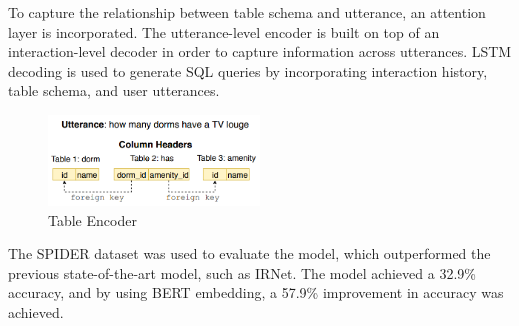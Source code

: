 To capture the relationship between table schema and utterance, an attention layer is incorporated.
The utterance-level encoder is built on top of an interaction-level decoder in order to capture information across utterances.
LSTM decoding is used to generate SQL queries by incorporating interaction history, table schema, and user utterances.

\begin{figure}[htb]
    \centering
    \includegraphics[width=0.5\textwidth]{pics/EditSQL/example.png}
    \caption{Table Encoder \cite{DBLP:journals/corr/abs-1909-00786}}
    \label{fig:EditSQL_example}
\end{figure}

The SPIDER dataset was used to evaluate the model, which outperformed the previous state-of-the-art model, such as IRNet. The model achieved a 32.9\% accuracy, and by using BERT embedding, a 57.9\% improvement in accuracy was achieved.
